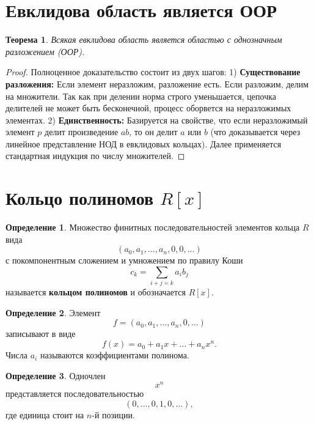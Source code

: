 \documentclass[12pt, a4paper]{article}
\newtheorem{theorem}{Теорема}
\theoremstyle{definition}
\newtheorem{definition}{Определение}
\theoremstyle{remark}
\begin{document}
\section{Евклидова область является ООР}

\begin{theorem}
	Всякая евклидова область является областью с однозначным разложением (ООР).
\end{theorem}
\begin{proof}
	Полноценное доказательство состоит из двух шагов:
	1) \textbf{Существование разложения:} Если элемент неразложим, разложение есть. Если разложим, делим на множители. Так как при делении норма строго уменьшается, цепочка делителей не может быть бесконечной, процесс оборвется на неразложимых элементах.
	2) \textbf{Единственность:} Базируется на свойстве, что если неразложимый элемент $p$ делит произведение $ab$, то он делит $a$ или $b$ (что доказывается через линейное представление НОД в евклидовых кольцах). Далее применяется стандартная индукция по числу множителей.
\end{proof}

\section{Кольцо полиномов $R[x]$}

\begin{definition}
	Множество финитных последовательностей элементов кольца $R$
	вида
	\[
	(a_0,a_1,\dots,a_n,0,0,\dots)
	\]
	с покомпонентным сложением и умножением по правилу Коши
	\[
	c_k=\sum_{i+j=k} a_i b_j
	\]
	называется \textbf{кольцом полиномов} и обозначается $R[x]$.
\end{definition}

\begin{definition}
	Элемент
	\[
	f=(a_0,a_1,\dots,a_n,0,\dots)
	\]
	записывают в виде
	\[
	f(x)=a_0+a_1x+\dots+a_nx^n.
	\]
	Числа $a_i$ называются коэффициентами полинома.
\end{definition}

\begin{definition}
	Одночлен
	\[
	x^n
	\]
	представляется последовательностью
	\[
	(0,\dots,0,1,0,\dots),
	\]
	где единица стоит на $n$-й позиции.
\end{definition}
\end{document}
